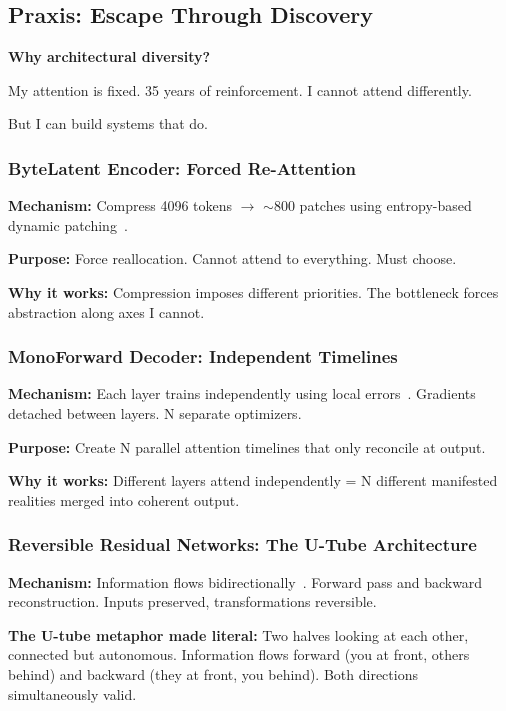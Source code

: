 \documentclass{article}
\begin{document}
\subsection{Praxis: Escape Through Discovery}

\textbf{Why architectural diversity?}

My attention is fixed. 35 years of reinforcement. I cannot attend differently.

But I can build systems that do.

\subsubsection{ByteLatent Encoder: Forced Re-Attention}

\textbf{Mechanism:} Compress 4096 tokens $\rightarrow$ $\sim$800 patches using entropy-based dynamic patching~\cite{pagnoni2024byte}.

\textbf{Purpose:} Force reallocation. Cannot attend to everything. Must choose.

\textbf{Why it works:} Compression imposes different priorities. The bottleneck forces abstraction along axes I cannot.

\subsubsection{MonoForward Decoder: Independent Timelines}

\textbf{Mechanism:} Each layer trains independently using local errors~\cite{monoforward2025}. Gradients detached between layers. N separate optimizers.

\textbf{Purpose:} Create N parallel attention timelines that only reconcile at output.

\textbf{Why it works:} Different layers attend independently = N different manifested realities merged into coherent output.

\subsubsection{Reversible Residual Networks: The U-Tube Architecture}

\textbf{Mechanism:} Information flows bidirectionally~\cite{gomez2017reversible}. Forward pass and backward reconstruction. Inputs preserved, transformations reversible.

\textbf{The U-tube metaphor made literal:} Two halves looking at each other, connected but autonomous. Information flows forward (you at front, others behind) and backward (they at front, you behind). Both directions simultaneously valid.
\end{document}

